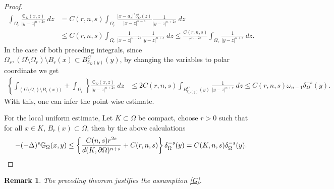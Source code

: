 \documentclass{amsart}
\newtheorem{remark}[theorem]{Remark}
\newcommand{\slap}{(-\Delta)^{s}}
\newcommand{\gk}[1]{\mathbb{G}_{#1}}
\begin{document}
\begin{proof}
    \begin{equation*}
    \begin{split}
      \int_{\Omega_{r}} \frac{\gk{\Omega}(x,z)}{|y-z|^{n+2s}}\ dz&=C(r,n,s)\int_{\Omega_{r}}\frac{|x-a_{z}|^{s}\delta_{\Omega}^{s}(z)}{|x-z|^{n-s}}\frac{1}{|y-z|^{n+2s}}\ dz\\
      &\leq C(r,n,s)\int_{\Omega_{r}}\frac{1}{|x-z|^{n-2s}}\frac{1}{|y-z|^{n+s}}\ dz 
      \leq \frac{C(r,n,s)}{r^{n-2s}}\int_{\Omega_{r}}\frac{1}{|y-z|^{n+s}}\ dz.
      \end{split}
    \end{equation*}
   In the case of both preceding integrals, since $\Omega_{r}, (\Omega\setminus\Omega_{r})\setminus B_{r}(x) \subset B_{\delta_{\Omega}(y)}^{C}(y)$, by changing the variables to polar coordinate we get
    \begin{equation*}
        \begin{split}
        \left\{\int_{(\Omega\setminus\Omega_{r})\setminus B_{r}(x))}+\int_{\Omega_{r}}\right\}\frac{\gk{\Omega}(x,z)}{|y-z|^{n+2s}}\ dz&\leq 2C(r,n,s)\int_{B_{\delta_{\Omega}(y)}^{C}(y)}\frac{1}{|y-z|^{n+s}}\ dz 
         \leq C(r,n,s) \omega_{n-1} \delta_{\Omega}^{-s}(y).
        \end{split}
    \end{equation*}
    With this, one can infer the point wise  estimate.

    
    For the local uniform estimate, Let $K  \subset  \Omega$ be compact, choose $r>0$ such that for all $x\in K$, $B_{r}(x)\subset \Omega$, then by the above calculations
    \begin{equation*}
         -\slap\gk{\Omega}(x,y)\leq \left\{\frac{C(n,s)r^{2s}}{d(K,\partial\Omega)^{n+s}}+C(r,n,s)\right\}\delta_{\Omega}^{-s}(y)=C(K,n,s)\delta_{\Omega}^{-s}(y).\qedhere
    \end{equation*}
\end{proof}
\begin{remark}
    The preceding theorem justifies the assumption \ref{G}.
\end{remark}
\end{document}
